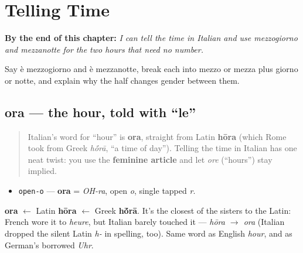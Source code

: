 
\chapter{Telling Time}
\label{ch:it-telling-time}

\begin{chapteropening}
\textbf{By the end of this chapter:} \emph{I can tell the time in Italian and use mezzogiorno and mezzanotte for the two hours that need no number.}

Say è mezzogiorno and è mezzanotte, break each into mezzo or mezza plus giorno or notte, and explain why the half changes gender between them.
\end{chapteropening}

\section[ora]{ora — the hour, told with \textquotedblleft{}le\textquotedblright{}}

\label{lesson:IT-C08-ora}



\begin{quote}
Italian's word for \textquotedblleft{}hour\textquotedblright{} is \textbf{ora}, straight from Latin \textbf{hōra} (which Rome took from Greek \emph{h\'{\={o}}rā}, \textquotedblleft{}a time of day\textquotedblright{}). Telling the time in Italian has one neat twist: you use the \textbf{feminine article} and let \emph{ore} (\textquotedblleft{}hours\textquotedblright{}) stay implied.
\end{quote}

\begin{sounds}
\begin{itemize}
\raggedright
  \item \texttt{open-o} — \textbf{ora} = \emph{OH-ra}, open \emph{o}, single tapped \emph{r}.
\end{itemize}
\end{sounds}

\begin{cousinweb}
\textbf{ora} $\leftarrow$ Latin \textbf{hōra} $\leftarrow$ Greek \textbf{h\'{\={o}}rā}. It's the closest of the sisters to the Latin: French wore it to \emph{heure}, but Italian barely touched it — \emph{hōra $\to$ ora} (Italian dropped the silent Latin \emph{h-} in spelling, too). Same word as English \emph{hour}, and as German's borrowed \emph{Uhr}.
\end{cousinweb}

